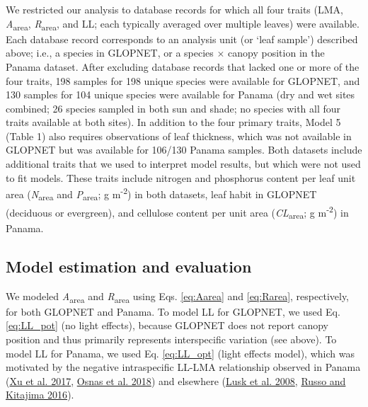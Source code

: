 \documentclass[
  12pt,
  a4paper,
,tablecaptionabove
]{scrartcl}
\begin{document}
We restricted our analysis to database records for which all four traits
(LMA, \emph{A}\textsubscript{area}, \emph{R}\textsubscript{area}, and
LL; each typically averaged over multiple leaves) were available. Each
database record corresponds to an analysis unit (or `leaf sample')
described above; i.e., a species in GLOPNET, or a species \(\times\)
canopy position in the Panama dataset. After excluding database records
that lacked one or more of the four traits, 198 samples for 198 unique
species were available for GLOPNET, and 130 samples for 104 unique
species were available for Panama (dry and wet sites combined; 26
species sampled in both sun and shade; no species with all four traits
available at both sites). In addition to the four primary traits, Model
5 (Table 1) also requires observations of leaf thickness, which was not
available in GLOPNET but was available for 106/130 Panama samples. Both
datasets include additional traits that we used to interpret model
results, but which were not used to fit models. These traits include
nitrogen and phosphorus content per leaf unit area
(\emph{N}\textsubscript{area} and \emph{P}\textsubscript{area}; g
m\textsuperscript{-2}) in both datasets, leaf habit in GLOPNET
(deciduous or evergreen), and cellulose content per unit area
(\emph{CL}\textsubscript{area}; g m\textsuperscript{-2}) in Panama.

\hypertarget{model-estimation-and-evaluation}{%
\subsection{Model estimation and
evaluation}\label{model-estimation-and-evaluation}}

We modeled \emph{A}\textsubscript{area} and \emph{R}\textsubscript{area}
using Eqs. \ref{eq:Aarea} and \ref{eq:Rarea}, respectively, for both
GLOPNET and Panama. To model LL for GLOPNET, we used Eq. \ref{eq:LL_pot}
(no light effects), because GLOPNET does not report canopy position and
thus primarily represents interspecific variation (see above). To model
LL for Panama, we used Eq. \ref{eq:LL_opt} (light effects model), which
was motivated by the negative intraspecific LL-LMA relationship observed
in Panama (\protect\hyperlink{ref-Xu2017}{Xu et al. 2017},
\protect\hyperlink{ref-Osnas2018}{Osnas et al. 2018}) and elsewhere
(\protect\hyperlink{ref-Lusk2008}{Lusk et al. 2008},
\protect\hyperlink{ref-Russo2016}{Russo and Kitajima 2016}).
\end{document}

